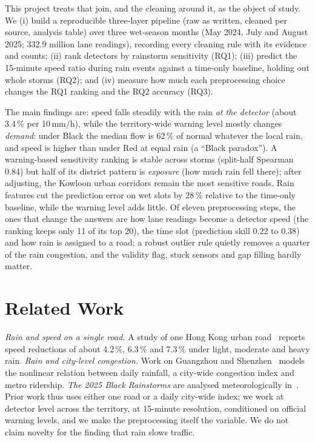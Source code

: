 \documentclass[conference]{IEEEtran}
\begin{document}
This project treats that join, and the cleaning around it, as the object of study. We
(i) build a reproducible three-layer pipeline (raw as written, cleaned per source, analysis
table) over three wet-season months (May 2024, July and August 2025; 332.9 million lane
readings), recording every cleaning rule with its evidence and counts;
(ii) rank detectors by rainstorm sensitivity (RQ1); (iii) predict the 15-minute speed ratio
during rain events against a time-only baseline, holding out whole storms (RQ2); and
(iv) measure how much each preprocessing choice changes the RQ1 ranking and the RQ2 accuracy
(RQ3).

The main findings are: speed falls steadily with the rain \emph{at the detector} (about
3.4\,\% per 10\,mm/h), while the territory-wide warning level mostly changes \emph{demand}:
under Black the median flow is 62\,\% of normal whatever the local rain, and speed is higher
than under Red at equal rain (a ``Black paradox''). A warning-based sensitivity ranking is
stable across storms (split-half Spearman 0.84) but half of its district pattern is
\emph{exposure} (how much rain fell there); after adjusting, the Kowloon urban corridors
remain the most sensitive roads. Rain features cut the prediction error on wet slots by
28\,\% relative to the time-only baseline, while the warning level adds little. Of eleven
preprocessing steps, the ones that change the answers are how lane readings become a detector
speed (the ranking keeps only 11 of its top 20), the time slot (prediction skill 0.22 to 0.38)
and how rain is assigned to a road; a robust outlier rule quietly removes a quarter of the
rain congestion, and the validity flag, stuck sensors and gap filling hardly matter.


\section{Related Work}
\emph{Rain and speed on a single road.} A study of one Hong Kong urban
road~\cite{ijgi2021rain} reports speed reductions of about 4.2\,\%, 6.3\,\% and 7.3\,\% under
light, moderate and heavy rain. \emph{Rain and city-level congestion.} Work on Guangzhou and
Shenzhen~\cite{frontiers2026rain} models the nonlinear relation between daily rainfall, a
city-wide congestion index and metro ridership. \emph{The 2025 Black Rainstorms} are analysed
meteorologically in~\cite{arxiv2025black}. Prior work thus uses either one road or a daily
city-wide index; we work at detector level across the territory, at 15-minute resolution,
conditioned on official warning levels, and we make the preprocessing itself the variable.
We do not claim novelty for the finding that rain slows traffic.
\end{document}
